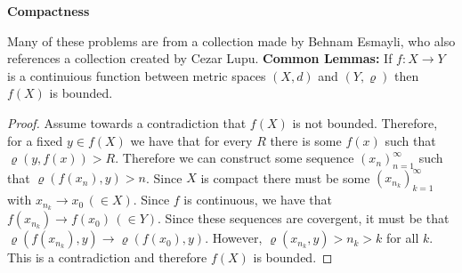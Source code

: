 \documentclass[12pt,leqno]{amsart}
\begin{document}
\bigskip
\centerline{\bf{Compactness}}
\medskip
\noindent \small{Many of these problems are from a collection made by Behnam Esmayli, who also references a collection created by Cezar Lupu.}
\bigskip
\newline
{\bf Common Lemmas:}
\newline
If $f: X \to Y$ is a continuious function between metric spaces $(X,d)$ and $(Y,\varrho)$ then $f(X)$ is bounded.
\begin{proof}
Assume towards a contradiction that $f(X)$ is not bounded.  Therefore, for a fixed $y\in f(X)$ we have that for every $R$ there is some $f(x)$ such that $\varrho(y, f(x)) > R$.  Therefore we can construct some sequence $(x_n)_{n=1}^\infty$ such that $\varrho(f(x_n), y) > n$.  Since $X$ is compact there must be some $(x_{n_k})_{k=1}^\infty$ with $x_{n_k} \to x_0 \, (\in X)$.  Since $f$ is continuous, we have that $f(x_{n_k}) \to f(x_0) \, (\in Y)$.  Since these sequences are covergent, it must be that $\varrho(f(x_{n_k}) ,y) \to \varrho(f(x_0) , y)$.  However, $\varrho(x_{n_k} , y) > n_k > k$ for all $k$.  This is a contradiction and therefore $f(X)$ is bounded.
\end{proof}
\end{document}

